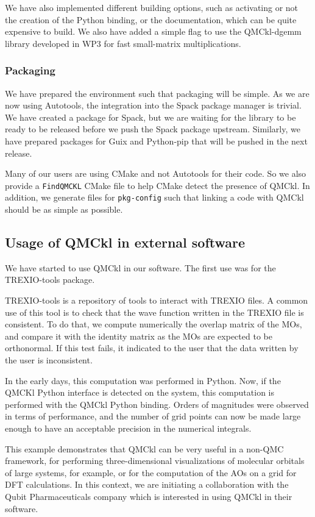 We have also implemented different building options, such as
activating or not the creation of the Python binding, or the
documentation, which can be quite expensive to build. We also have
added a simple flag to use the QMCkl-dgemm library developed in WP3 for
fast small-matrix multiplications.

\subsubsection{Packaging}

We have prepared the environment such that packaging will be
simple. As we are now using Autotools, the integration into the Spack
package manager is trivial. We have created a package for Spack, but
we are waiting for the library to be ready to be released before we
push the Spack package upstream.
Similarly, we have prepared packages for Guix and Python-pip that
will be pushed in the next release.

Many of our users are using CMake and not Autotools for their code. So
we also provide a \texttt{FindQMCKL} CMake file to help CMake detect
the presence of QMCkl. In addition, we generate files for
\texttt{pkg-config} such that linking a code with QMCkl should be as
simple as possible.

\subsection{Usage of QMCkl in external software}

We have started to use QMCkl in our software. The first use was for
the TREXIO-tools package.

TREXIO-tools is a repository of tools to interact with TREXIO files. A
common use of this tool is to check that the wave function written in
the TREXIO file is consistent. To do that, we compute numerically the
overlap matrix of the \acp{MO}, and compare it with the identity
matrix as the \acp{MO} are expected to be orthonormal. If this test
fails, it indicated to the user that the data written by the user is
inconsistent.

In the early days, this computation was performed in Python. Now, if
the QMCKl Python interface is detected on the system, this computation
is performed with the QMCkl Python binding. Orders of magnitudes were
observed in terms of performance, and the number of grid points can
now be made large enough to have an acceptable precision in the
numerical integrals.

This example demonstrates that QMCkl can be very useful in a non-QMC
framework, for performing three-dimensional visualizations of molecular
orbitals of large systems, for example, or for the computation of the
\acp{AO} on a grid for \ac{DFT} calculations. In this context, we are
initiating a collaboration with the Qubit Pharmaceuticals company
which is interested in using QMCkl in their software.

